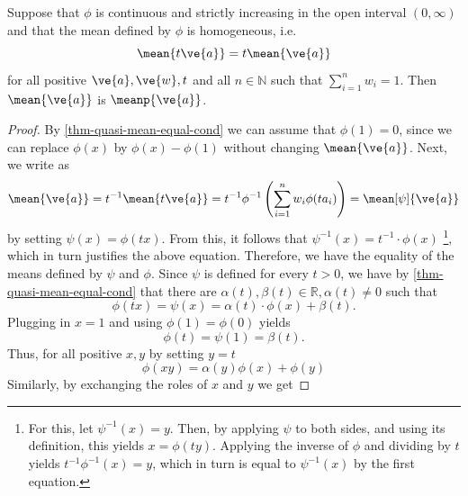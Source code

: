 \begin{thm} \label{thm-power-mean-uniqueness}
	Suppose that $\phi$ is continuous and strictly increasing in the open interval $(0,\infty)$ and that the mean defined by $\phi$ is homogeneous, i.e.
  \begin{equation} \label{thm-quasi-homogen-eq}
		\mean{t \ve{a} } = t \mean{\ve{a}}
  \end{equation}
	for all positive $\ve{a}, \ve{w},t$ and all $n \in \mathbb{N}$ such that $\sum_{i=1}^{n} w_i = 1$. Then $\mean{ \ve{a}}$ is $\meanp{\ve{a} }$.

\end{thm}

\begin{proof}
  By \cref{thm-quasi-mean-equal-cond} we can assume that $\phi(1) = 0$, since we can replace $\phi(x)$ by $\phi(x) - \phi(1)$ without changing $\mean{\ve{a}}$. Next, we write  as
  \begin{align*}
    \mean{\ve{a}} = t^{-1} \mean{t\ve{a}} = t^{-1} \phi^{-1} \left ( \sum_{i=1}^{n} w_i \phi(t a_i) \right) = \mean[\psi]{\ve{a}}
  \end{align*}
  by setting $\psi(x) = \phi(t x)$. From this, it follows that $\psi^{-1}(x) = t^{-1} \cdot \phi(x)$ \footnote{For this, let $\psi^{-1}(x) = y$. Then, by applying $\psi$ to both sides, and using its definition, this yields $x = \phi(ty)$. Applying the inverse of $\phi$ and dividing by $t$ yields $t^{-1} \phi^{-1}(x) = y$, which in turn is equal to $\psi^{-1}(x)$ by the first equation.}, which in turn justifies the above equation.
  Therefore, we have the equality of the means defined by $\psi$ and $\phi$. Since $\psi$ is defined for every $t > 0$, we have by \cref{thm-quasi-mean-equal-cond} that there are $\alpha(t), \beta(t) \in \mathbb{R}, \alpha(t) \neq  0$ such that
  \begin{equation*}
  \phi(t x) = \psi(x) = \alpha(t) \cdot \phi(x) + \beta(t).
  \end{equation*}
  Plugging in $x=1$ and using $\phi(1) = \phi(0)$ yields
  \begin{equation*}
  \phi(t) = \psi(1) = \beta(t).
  \end{equation*}
  Thus, for all positive $x, y$ by setting $y=t$
  \begin{equation} \label{proof-quasi-eq2}
    \phi(x y) = \alpha(y)\phi(x) + \phi(y)
  \end{equation}
  Similarly, by exchanging the roles of $x$ and $y$ we get

\end{proof}
